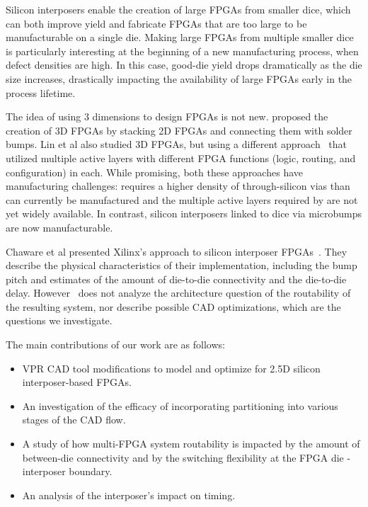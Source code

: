 \documentclass[journal]{IEEEtran}
\begin{document}
Silicon interposers enable the creation of large FPGAs from smaller dice, which can both improve yield and fabricate FPGAs that are too large to be manufacturable on a single die. Making large FPGAs from multiple smaller dice is particularly interesting at the beginning of a new manufacturing process, when defect densities are high. In this case, good-die yield drops dramatically as the die size increases, drastically impacting the availability of large FPGAs early in the process lifetime.

The idea of using 3 dimensions to design FPGAs is not new. \cite{3dfpga1995} proposed the creation of 3D FPGAs by stacking 2D FPGAs and connecting them with solder bumps. Lin et al also studied 3D FPGAs, but using a different approach~\cite{3dfpga} that utilized multiple active layers with different FPGA functions (logic, routing, and configuration) in each. While promising, both these approaches have manufacturing challenges: \cite{3dfpga1995} requires a higher density of through-silicon vias than can currently be manufactured and the multiple active layers required by \cite{3dfpga} are not yet widely available. In contrast, silicon interposers linked to dice via microbumps are now manufacturable.

Chaware et al presented Xilinx's approach to silicon interposer FPGAs~\cite{xilinxTSV}. They describe the physical characteristics of their implementation, including the bump pitch and estimates of the amount of die-to-die connectivity and the die-to-die delay. However~\cite{xilinxTSV} does not analyze the architecture question of the routability of the resulting system, nor describe possible CAD optimizations, which are the questions we investigate.

The main contributions of our work are as follows:
\begin{itemize}
	\item VPR CAD tool modifications to model and optimize for 2.5D silicon interposer-based FPGAs.
	\item An investigation of the efficacy of incorporating partitioning into various stages of the CAD flow.
	\item A study of how multi-FPGA system routability is impacted by the amount of between-die connectivity and by the switching flexibility at the FPGA die - interposer boundary.
	\item An analysis of the interposer's impact on timing.
\end{itemize}
\end{document}
